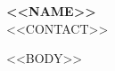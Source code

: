 \documentclass[10pt]{article}
\begin{document}
\begin{center}
  {\fontsize{16}{18}\selectfont\bfseries <<NAME>>}\\[2pt]
  {\fontsize{11}{13}\selectfont <<CONTACT>>}
\end{center}

<<BODY>>
\end{document}
